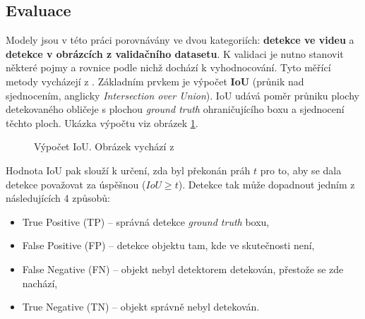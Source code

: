 \subsection*{Evaluace}
Modely jsou v této práci porovnávány ve dvou kategoriích: \textbf{detekce ve videu} a \textbf{detekce v obrázcích z validačního datasetu}. K validaci je nutno stanovit některé pojmy a rovnice podle nichž dochází k vyhodnocování. Tyto měřící metody vycházejí z \cite{detekceMetriky}. Základním prvkem je výpočet \textbf{IoU} (průnik nad sjednocením, anglicky \emph{Intersection over Union}). IoU udává poměr průniku plochy detekovaného obličeje s plochou \emph{ground truth} ohraničujícího boxu a sjednocení těchto ploch. Ukázka výpočtu viz obrázek \ref{obrazek:iou}.

\begin{figure}[H] 
  \begin{center}
  \label{obrazek:iou}
  \caption{Výpočet IoU. Obrázek vychází z \cite{detekceMetriky}}
  \end{center}
\end{figure}

Hodnota IoU pak slouží k určení, zda byl překonán práh $t$ pro to, aby se dala detekce považovat za úspěšnou ($IoU \ge t$). Detekce tak může dopadnout jedním z následujících 4 způsobů:

\begin{itemize}
  \item True Positive (TP) -- správná detekce \emph{ground truth} boxu,
  \item False Positive (FP) -- detekce objektu tam, kde ve skutečnosti není,
  \item False Negative (FN) -- objekt nebyl detektorem detekován, přestože se zde nachází,
  \item True Negative (TN) -- objekt správně nebyl detekován.
\end{itemize}

